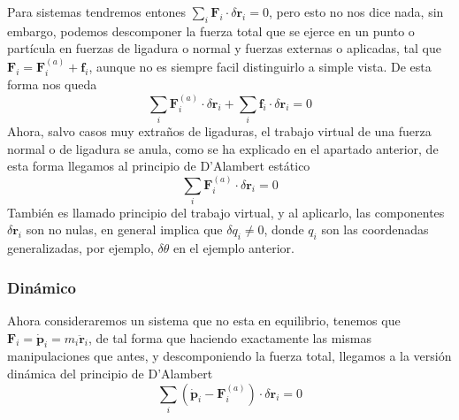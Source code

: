 Para sistemas tendremos entones $\sum_i \mathbf{F}_i \cdot \delta \mathbf{r}_i = 0$, pero esto no nos dice nada, sin embargo, podemos descomponer la fuerza total que se ejerce en un punto o partícula en fuerzas de ligadura o normal y fuerzas externas o aplicadas, tal que $\mathbf{F}_i = \mathbf{F}_i^{(a)}+\mathbf{f}_i$, aunque no es siempre facil distinguirlo a simple vista. De esta forma nos queda
\begin{equation} \label{2.1.1}
    \sum_i \mathbf{F}_i^{(a)} \cdot \delta \mathbf{r}_i + \sum_i \mathbf{f}_i \cdot \delta \mathbf{r}_i = 0
\end{equation} 
Ahora, salvo casos muy extraños de ligaduras, el trabajo virtual de una fuerza normal o de ligadura se anula, como se ha explicado en el apartado anterior, de esta forma llegamos al principio de D'Alambert estático
\begin{equation} \label{2.1.1}
    \sum_i \mathbf{F}_i^{(a)} \cdot \delta \mathbf{r}_i = 0
\end{equation} 
También es llamado principio del trabajo virtual, y al aplicarlo, las componentes $\delta \mathbf{r}_i$ son no nulas, en general implica que $\delta q_i \neq 0$, donde $q_i$ son las coordenadas generalizadas, por ejemplo, $\delta \theta$ en el ejemplo anterior.
\subsubsection{Dinámico}
Ahora consideraremos un sistema que no esta en equilibrio, tenemos que $\mathbf{F}_i = \dot{\mathbf{p}}_i = m_i \ddot{\mathbf{r}}_i$, de tal forma que haciendo exactamente las mismas manipulaciones que antes, y descomponiendo la fuerza total, llegamos a la versión dinámica del principio de D'Alambert
\begin{equation} \label{2.1.1}
    \sum_i (\dot{\mathbf{p}}_i-\mathbf{F}_i^{(a)}) \cdot \delta \mathbf{r}_i = 0
\end{equation} 
